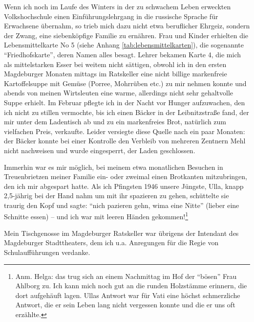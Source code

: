 \documentclass[a5paper,pagesize,10pt,twoside=true]{scrbook}
\renewcommand{\marginpar}[2][]{}
\begin{document}
Wenn ich noch im Laufe des Winters in der zu schwachem Leben erweckten Volkshochschule einen Einführungslehrgang in die russische Sprache für Erwachsene übernahm, so trieb mich dazu nicht etwa beruflicher Ehrgeiz, sondern der Zwang, eine siebenköpfige Familie zu ernähren. Frau und Kinder erhielten die Lebensmittelkarte No 5 (siehe Anhang \ref{tab:lebensmittelkarten}), die sogenannte \enquote{Friedhofskarte}, deren Namen alles besagt. Lehrer bekamen Karte 4, die mich als mittelstarken Esser bei weitem nicht sättigen, obwohl ich in den ersten Magdeburger Monaten mittags im Ratskeller eine nicht billige markenfreie Kartoffelsuppe mit Gemüse (Porree, Mohrrüben etc.) zu mir nehmen konnte und abends von meinen Wirtsleuten eine warme, allerdings nicht sehr gehaltvolle Suppe erhielt. Im Februar pflegte ich in der Nacht vor Hunger aufzuwachen, den ich nicht zu stillen vermochte, \marginpar{131} bis ich einen Bäcker in der Leibnitzstraße fand, der mir unter dem Ladentisch ab und zu ein markenfreies Brot, natürlich zum vielfachen Preis, verkaufte. Leider versiegte diese Quelle nach ein paar Monaten: der Bäcker konnte bei einer Kontrolle den Verbleib von mehreren Zentnern Mehl nicht nachweisen und wurde eingesperrt, der Laden geschlossen.

Immerhin war es mir möglich, bei meinem etwa monatlichen Besuchen in Treuenbrietzen meiner Familie ein- oder zweimal einen Brotkanten mitzubringen, den ich mir abgespart hatte. Als ich Pfingsten 1946 unsere Jüngste, Ulla, knapp 2,5-jährig bei der Hand nahm um mit ihr spazieren zu gehen, schüttelte sie traurig den Kopf und sagte: \enquote{nich pazieren gehn, wima eine Nitte} (lieber eine Schnitte essen) -- und ich war mit leeren Händen gekommen!\footnote{Anm. Helga: das trug sich an einem Nachmittag im Hof der \enquote{bösen} Frau Ahlborg zu. Ich kann mich noch gut an die runden Holzstämme erinnern, die dort aufgehäuft lagen. Ullas Antwort war für Vati eine höchst schmerzliche Antwort, die er sein Leben lang nicht vergessen konnte und die er uns oft erzählte.}

Mein Tischgenosse im Magdeburger Ratskeller war übrigens der Intendant des Magdeburger Stadttheaters, dem ich u.a. Anregungen für die Regie von Schulaufführungen verdanke.
\end{document}
